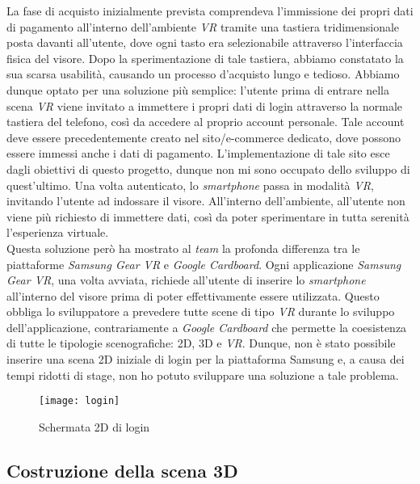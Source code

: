 La fase di acquisto inizialmente prevista comprendeva l'immissione dei propri dati di pagamento all'interno dell'ambiente \textit{VR} tramite una tastiera tridimensionale posta davanti all'utente, dove ogni tasto era selezionabile attraverso l'interfaccia fisica del visore. Dopo la sperimentazione di tale tastiera, abbiamo constatato la sua scarsa usabilità, causando un processo d'acquisto lungo e tedioso. Abbiamo dunque optato per una soluzione più semplice: l'utente prima di entrare nella scena \textit{VR} viene invitato a immettere i propri dati di login attraverso la normale tastiera del telefono, così da accedere al proprio account personale. Tale account deve essere precedentemente creato nel sito/e-commerce dedicato, dove possono essere immessi anche i dati di pagamento. L'implementazione di tale sito esce dagli obiettivi di questo progetto, dunque non mi sono occupato dello sviluppo di quest'ultimo. Una volta autenticato, lo \textit{smartphone} passa in modalità \textit{VR}, invitando l'utente ad indossare il visore. All'interno dell'ambiente, all'utente non viene più richiesto di immettere dati, così da poter sperimentare in tutta serenità l'esperienza virtuale. \\
Questa soluzione però ha mostrato al \textit{team} la profonda differenza tra le piattaforme \textit{Samsung Gear VR} e \textit{Google Cardboard}. Ogni applicazione \textit{Samsung Gear VR}, una volta avviata, richiede all'utente di inserire lo \textit{smartphone} all'interno del visore prima di poter effettivamente essere utilizzata. Questo obbliga lo sviluppatore a prevedere tutte scene di tipo \textit{VR} durante lo sviluppo dell'applicazione, contrariamente a \textit{Google Cardboard} che permette la coesistenza di tutte le tipologie scenografiche: 2D, 3D e \textit{VR}. Dunque, non è stato possibile inserire una scena 2D iniziale di login per la piattaforma Samsung e, a causa dei tempi ridotti di stage, non ho potuto sviluppare una soluzione a tale problema.

\label{Login}
\begin{figure}[ht]
	\begin{center}
		\texttt{[image: login]}
		\caption{Schermata 2D di login}
	\end{center}
\end{figure}
\FloatBarrier

\subsection{Costruzione della scena 3D}

